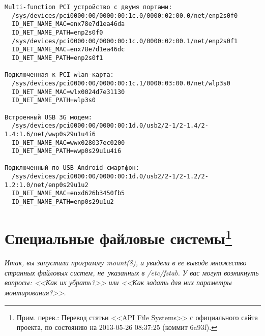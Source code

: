 \documentclass[10pt,oneside,a4paper]{article}
\newcommand{\sfnote}[1]{\texorpdfstring{\protect\footnote%
	{Прим. перев.: #1}}{}}
\newcommand\yousaywtf[1]{\emph{#1}}
\newcommand\yousaywtfsk[1]{\yousaywtf{#1}\medskip\par}
\begin{document}
\begin{Verbatim}
Multi-function PCI устройство с двумя портами:
  /sys/devices/pci0000:00/0000:00:1c.0/0000:02:00.0/net/enp2s0f0
  ID_NET_NAME_MAC=enx78e7d1ea46da
  ID_NET_NAME_PATH=enp2s0f0
  /sys/devices/pci0000:00/0000:00:1c.0/0000:02:00.1/net/enp2s0f1
  ID_NET_NAME_MAC=enx78e7d1ea46dc
  ID_NET_NAME_PATH=enp2s0f1

Подключенная к PCI wlan-карта:
  /sys/devices/pci0000:00/0000:00:1c.1/0000:03:00.0/net/wlp3s0
  ID_NET_NAME_MAC=wlx0024d7e31130
  ID_NET_NAME_PATH=wlp3s0

Встроенный USB 3G модем:
  /sys/devices/pci0000:00/0000:00:1d.0/usb2/2-1/2-1.4/2-1.4:1.6/net/wwp0s29u1u4i6
  ID_NET_NAME_MAC=wwx028037ec0200
  ID_NET_NAME_PATH=wwp0s29u1u4i6

Подключенный по USB Android-смартфон:
  /sys/devices/pci0000:00/0000:00:1d.0/usb2/2-1/2-1.2/2-1.2:1.0/net/enp0s29u1u2
  ID_NET_NAME_MAC=enxd626b3450fb5
  ID_NET_NAME_PATH=enp0s29u1u2
\end{Verbatim}

\section{Специальные файловые системы\sfnote{Перевод статьи
<<\href{http://www.freedesktop.org/wiki/Software/systemd/APIFileSystems}{API
File Systems}>> с официального сайта проекта, по состоянию на 2013-05-26
08:37:25 (коммит 6a93f).}}
\label{sec:apifs}

\yousaywtfsk{Итак, вы запустили программу mount(8), и увидели в ее выводе
множество странных файловых систем, не~указанных в /etc/fstab. У вас могут
возникнуть вопросы: <<Как их убрать?>> или <<Как задать для них параметры
монтирования?>>.}
\end{document}
